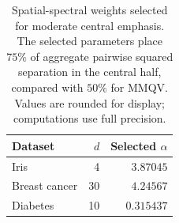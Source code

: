 \begin{table}[ht]
\caption{Spatial-spectral weights selected for moderate central emphasis.
The selected parameters place $75\%$ of aggregate pairwise squared
separation in the central half, compared with $50\%$ for MMQV.
Values are rounded for display; computations use full precision.}
\label{tabSelectedAlpha}
\centering
\begin{tabular}{lrr}
\toprule
Dataset & $d$ & Selected $\alpha$\\
\midrule
Iris & 4 & $3.87045$\\
Breast cancer & 30 & $4.24567$\\
Diabetes & 10 & $0.315437$\\
\bottomrule
\end{tabular}
\end{table}
